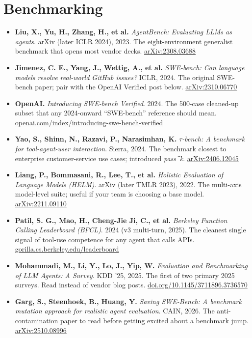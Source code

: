 \section{Benchmarking}

\begin{itemize}
\item \textbf{Liu, X., Yu, H., Zhang, H., et al.} \textit{AgentBench: Evaluating LLMs as agents}. arXiv (later ICLR 2024), 2023. The eight-environment generalist benchmark that opens most vendor decks. \href{https://arxiv.org/abs/2308.03688}{arXiv:2308.03688}

\item \textbf{Jimenez, C. E., Yang, J., Wettig, A., et al.} \textit{SWE-bench: Can language models resolve real-world GitHub issues?} ICLR, 2024. The original SWE-bench paper; pair with the OpenAI Verified post below. \href{https://arxiv.org/abs/2310.06770}{arXiv:2310.06770}

\item \textbf{OpenAI.} \textit{Introducing SWE-bench Verified}. 2024. The 500-case cleaned-up subset that any 2024-onward ``SWE-bench'' reference should mean. \href{https://openai.com/index/introducing-swe-bench-verified/}{openai.com/index/introducing-swe-bench-verified}

\item \textbf{Yao, S., Shinn, N., Razavi, P., Narasimhan, K.} \textit{$\tau$-bench: A benchmark for tool-agent-user interaction}. Sierra, 2024. The benchmark closest to enterprise customer-service use cases; introduced \textit{pass\textasciicircum{}k}. \href{https://arxiv.org/abs/2406.12045}{arXiv:2406.12045}

\item \textbf{Liang, P., Bommasani, R., Lee, T., et al.} \textit{Holistic Evaluation of Language Models (HELM)}. arXiv (later TMLR 2023), 2022. The multi-axis model-level suite; useful if your team is choosing a base model. \href{https://arxiv.org/abs/2211.09110}{arXiv:2211.09110}

\item \textbf{Patil, S. G., Mao, H., Cheng-Jie Ji, C., et al.} \textit{Berkeley Function Calling Leaderboard (BFCL)}. 2024 (v3 multi-turn, 2025). The cleanest single signal of tool-use competence for any agent that calls APIs. \href{https://gorilla.cs.berkeley.edu/leaderboard.html}{gorilla.cs.berkeley.edu/leaderboard}

\item \textbf{Mohammadi, M., Li, Y., Lo, J., Yip, W.} \textit{Evaluation and Benchmarking of LLM Agents: A Survey}. KDD '25, 2025. The first of two primary 2025 surveys. Read instead of vendor blog posts. \href{https://doi.org/10.1145/3711896.3736570}{doi.org/10.1145/3711896.3736570}

\item \textbf{Garg, S., Steenhoek, B., Huang, Y.} \textit{Saving SWE-Bench: A benchmark mutation approach for realistic agent evaluation}. CAIN, 2026. The anti-contamination paper to read before getting excited about a benchmark jump. \href{https://arxiv.org/abs/2510.08996}{arXiv:2510.08996}
\end{itemize}

